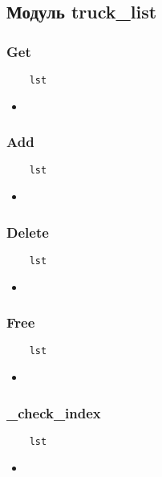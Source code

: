 \subsection{Модуль truck\_list}

\subsubsection{Get}

\begin{lstlisting}
    lst
\end{lstlisting}

\begin{itemize}
    \item \verb||
\end{itemize}

\subsubsection{Add}

\begin{lstlisting}
    lst
\end{lstlisting}

\begin{itemize}
    \item \verb||
\end{itemize}

\subsubsection{Delete}

\begin{lstlisting}
    lst
\end{lstlisting}

\begin{itemize}
    \item \verb||
\end{itemize}

\subsubsection{Free}

\begin{lstlisting}
    lst
\end{lstlisting}

\begin{itemize}
    \item \verb||
\end{itemize}

\subsubsection{\_check\_index}

\begin{lstlisting}
    lst
\end{lstlisting}

\begin{itemize}
    \item \verb||
\end{itemize}

